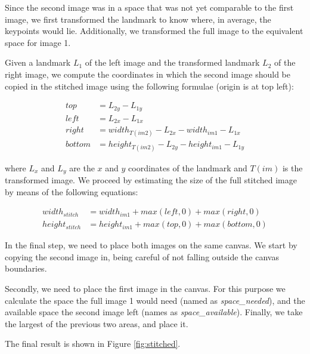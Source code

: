 \documentclass[11pt]{article}
\begin{document}
Since the second image was in a space that was not yet comparable to the first image, we first transformed the landmark to know where, in average, the keypoints would lie. Additionally, we transformed the full image to the equivalent space for image 1. 

Given a landmark $L_1$ of the left image and the transformed landmark $L_2$ of
the right image, we compute the coordinates in which the second image should be
copied in the stitched image using the following formulae (origin is at top left):

\begin{equation}
	\begin{split}
		top &= L_{2y} - L_{1y} \\
		left &= L_{2x} - L_{1x} \\
		right &= width_{T(im2)} - L_{2x} - width_{im1} - L_{1x} \\
		bottom &= height_{T(im2)} - L_{2y} - height_{im1} - L_{1y}
	\end{split}
	\label{eq:stitch_corners}
\end{equation}

where $L_x$ and $L_y$ are the $x$ and $y$ coordinates of the landmark and
$T(im)$ is the transformed image. We proceed by estimating the size of the full
stitched image by means of the following equations:

\begin{equation}
	\begin{split}
		width_{stitch} &= width_{im1} + max(left, 0) + max(right, 0) \\
		height_{stitch} &= height_{im1} + max(top, 0) + max(bottom, 0)
	\end{split}
	\label{eq:estimate_stitch}
\end{equation}

In the final step, we need to place both images on the same canvas. We start by copying the second image in, being careful of not falling outside the canvas boundaries. 

Secondly, we need to place the first image in the canvas. For this purpose we calculate the space the full image 1 would need (named as \textit{space\_needed}), and the available space the second image left (names as \textit{space\_available}). Finally, we take the largest of the previous two areas, and place it. 

The final result is shown in Figure \ref{fig:stitched}. 
\end{document}
